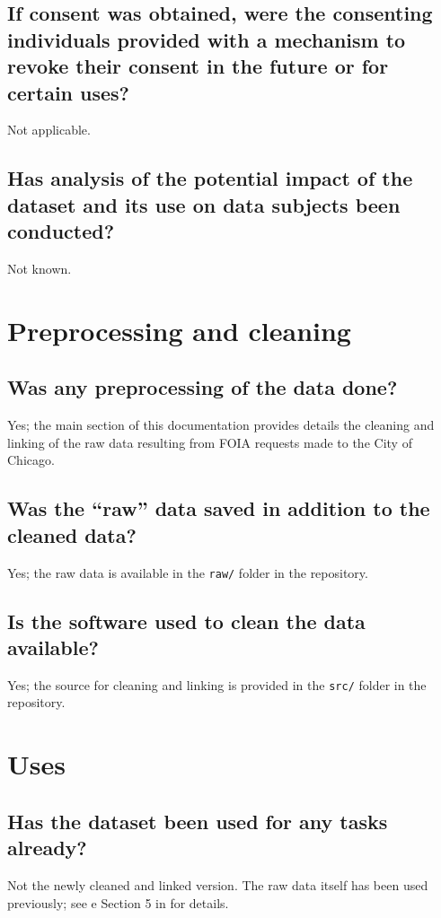 \documentclass[letterpaper, 10 pt, conference]{ieeeconf}  %
\begin{document}
\subsection{If consent was obtained, were the consenting individuals provided with a mechanism to revoke their consent in the future or for certain uses?}
Not applicable.

\subsection{Has analysis of the potential impact of the dataset and its use on data subjects been conducted?}
Not known.

\section{Preprocessing and cleaning}

\subsection{Was any preprocessing of the data done?}
Yes; the main section of this documentation provides details the cleaning and linking of the raw
data resulting from FOIA requests made to the City of Chicago.

\subsection{Was the ``raw'' data saved in addition to the cleaned data?}
Yes; the raw data is available in the \texttt{raw/} folder in the repository.

\subsection{Is the software used to clean the data available?}
Yes; the source for cleaning and linking is provided in the \texttt{src/} folder in the repository.

\section{Uses}

\subsection{Has the dataset been used for any tasks already?}
Not the newly cleaned and linked version.
The raw data itself has been used previously; see e Section 5 in \cite{horel2021the} for details.
\end{document}
